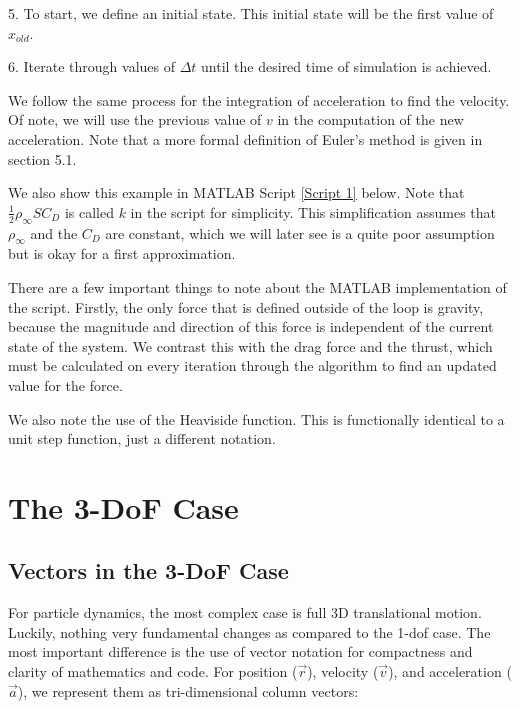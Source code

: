 \documentclass[12pt]{report}
\begin{document}
5. To start, we define an initial state. This initial state will be the first value of $x_{old}$. 

6. Iterate through values of $\Delta t$ until the desired time of simulation is achieved.

We follow the same process for the integration of acceleration to find the velocity. Of note, we will use the previous value of $v$ in the computation of the new acceleration. Note that a more formal definition of Euler’s method is given in section 5.1.

We also show this example in MATLAB Script \ref{Script 1} below. Note that $\frac{1}{2}\rho_{\infty}SC_D$ is called $k$ in the script for simplicity. This simplification assumes that $\rho_{\infty}$ and the $C_D$ are constant, which we will later see is a quite poor assumption but is okay for a first approximation.

\lstset{style=mystyle}

\label{Script 1}

There are a few important things to note about the MATLAB implementation of the script. Firstly, the only force that is defined outside of the loop is gravity, because the magnitude and direction of this force is independent of the current state of the system. We contrast this with the drag force and the thrust, which must be calculated on every iteration through the algorithm to find an updated value for the force.

We also note the use of the Heaviside function. This is functionally identical to a unit step function, just a different notation.

\section{The 3-DoF Case}\label{sec: 3DoF Case}
\subsection{Vectors in the 3-DoF Case}
For particle dynamics, the most complex case is full 3D translational motion. Luckily, nothing very fundamental changes as compared to the 1-\gls{dof} case. The most important difference is the use of vector notation for compactness and clarity of mathematics and code. For position ($\vec{r}$), velocity ($\vec {v}$), and acceleration ($\vec{a}$), we represent them as tri-dimensional column vectors:
\end{document}
